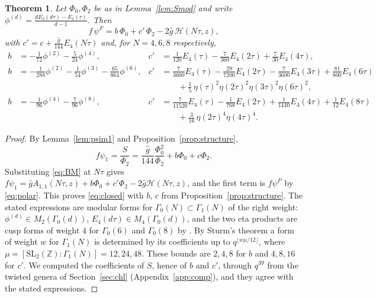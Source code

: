 \documentclass[11pt]{amsart}
\newtheorem{theorem}{Theorem}[section]
\theoremstyle{definition}
\newcommand{\ZZ}{\mathbb{Z}}
\newcommand{\Hc}{\mathcal{H}}
\newcommand{\gh}{\hat g}
\newcommand{\SL}{\mathrm{SL}_2(\ZZ)}
\begin{document}
\begin{theorem}\label{thm:closed}
Let $\Phi_0,\Phi_2$ be as in Lemma~\ref{lem:Smod} and write $\phi^{(d)}=\frac{dE_2(d\tau)-E_2(\tau)}{d-1}$. Then
\begin{equation}\label{eq:closed}
f\,\psi^F=b\,\Phi_0+c'\,\Phi_2-2\gh\,\Hc(N\tau,z),
\end{equation}
with $c'=c+\frac{\gh}{144}E_4(N\tau)$ and, for $N=4,6,8$ respectively,
\begin{align*}
b&=-\tfrac1{72}\phi^{(2)}-\tfrac5{24}\phi^{(4)}, & c'&=\tfrac1{120}E_4(\tau)-\tfrac7{360}E_4(2\tau)+\tfrac7{30}E_4(4\tau),\\
b&=-\tfrac1{288}\phi^{(2)}-\tfrac1{54}\phi^{(3)}-\tfrac{65}{864}\phi^{(6)}, & c'&=\tfrac7{3600}E_4(\tau)-\tfrac{29}{7200}E_4(2\tau)-\tfrac7{3600}E_4(3\tau)+\tfrac{81}{800}E_4(6\tau)\\
&&&\qquad+\tfrac15\,\eta(\tau)^2\eta(2\tau)^2\eta(3\tau)^2\eta(6\tau)^2,\\
b&=-\tfrac1{96}\phi^{(4)}-\tfrac7{96}\phi^{(8)}, & c'&=\tfrac7{11520}E_4(\tau)-\tfrac1{768}E_4(2\tau)+\tfrac1{1440}E_4(4\tau)+\tfrac1{12}E_4(8\tau)\\
&&&\qquad+\tfrac3{16}\,\eta(2\tau)^4\eta(4\tau)^4.
\end{align*}
\end{theorem}

\begin{proof}
By Lemma~\ref{lem:psim1} and Proposition~\ref{prop:structure},
\[
f\psi_1=\frac{S}{\Phi_2}=\frac{\gh}{144}\frac{\Phi_0^2}{\Phi_2}+b\Phi_0+c\Phi_2 .
\]
Substituting \eqref{eq:BM} at $N\tau$ gives $f\psi_1=\gh A_{1,1}(N\tau,z)+b\Phi_0+c'\Phi_2-2\gh\Hc(N\tau,z)$, and the first term is $f\psi^P$ by \eqref{eq:polar}. This proves \eqref{eq:closed} with $b$, $c$ from Proposition~\ref{prop:structure}. The stated expressions are modular forms for $\Gamma_0(N)\subset\Gamma_1(N)$ of the right weight: $\phi^{(d)}\in M_2(\Gamma_0(d))$, $E_4(d\tau)\in M_4(\Gamma_0(d))$, and the two eta products are cusp forms of weight $4$ for $\Gamma_0(6)$ and $\Gamma_0(8)$ by \cite[Theorem~1.64]{Ono04}. By Sturm's theorem \cite{Stu87} a form of weight $w$ for $\Gamma_1(N)$ is determined by its coefficients up to $q^{\lfloor w\mu/12\rfloor}$, where $\mu=[\SL:\Gamma_1(N)]=12,24,48$. These bounds are $2,4,8$ for $b$ and $4,8,16$ for $c'$. We computed the coefficients of $S$, hence of $b$ and $c'$, through $q^{39}$ from the twisted genera of Section~\ref{sec:chl} (Appendix~\ref{app:comp}), and they agree with the stated expressions.
\end{proof}
\end{document}
